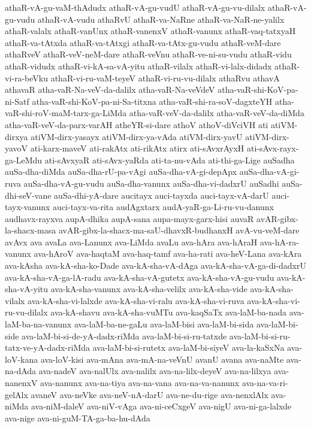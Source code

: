 {athaR-vA-gu-vaM-thAdudx
athaR-vA-gu-vudU
athaR-vA-gu-vu-dilalx
athaR-vA-gu-vudu
athaR-vA-vudu
athaRvU
athaR-va-NaRne
athaR-va-NaR-ne-yalilx
athaR-valalx
athaR-vanUnx
athaR-vanenxV
athaR-vanunx
athaR-vaq-tatxyaH
athaR-va-tAtxda
athaR-va-tAtxgi
athaR-va-tAtx-gu-vudu
athaR-veM-dare
athaRveV
athaR-veV-neM-dare
athaR-veVnu
athaR-ve-ni-su-vudu
athaR-vidu
athaR-vidudx
athaR-vi-kA-sa-vA-yitu
athaR-vilalx
athaR-vi-lalx-didadx
athaR-vi-ra-beVku
athaR-vi-ru-vaM-teyeV
athaR-vi-ru-vu-dilalx
athaRvu
athavA
athavaR
atha-vaR-Na-veV-da-dalilx
atha-vaR-Na-veVdeV
atha-vaR-shi-KoV-pa-ni-Satf
atha-vaR-shi-KoV-pa-ni-Sa-titxna
atha-vaR-shi-ra-soV-dagxteYH
atha-vaR-shi-roV-maM-tarx-ga-LiMda
atha-vaR-veV-da-dalilx
atha-vaR-veV-da-diMda
atha-vaR-veV-da-parx-varAH
atheYR-si-dare
athoV
athoV-diVciVH
ati
atiVM-dirxya
atiVM-dirx-yasayx
atiVM-dirx-ya-vAda
atiVM-dirx-yavU
atiVM-dirx-yavoV
ati-karx-maveV
ati-rakAtx
ati-rikAtx
atirx
ati-sAvxrAyxH
ati-sAvx-rayx-ga-LeMdu
ati-sAvxyaR
ati-sAvx-yaRda
ati-ta-nu-vAda
ati-thi-ga-Lige
auSadha
auSa-dha-diMda
auSa-dha-rU-pa-vAgi
auSa-dha-vA-gi-depApx
auSa-dha-vA-gi-ruva
auSa-dha-vA-gu-vudu
auSa-dha-vanunx
auSa-dha-vi-dadxrU
auSadhi
auSa-dhi-seV-vane
auSa-dhi-yA-dare
aucitayx
auci-tayxda
auci-tayx-vA-darU
auci-tayx-vanunx
auci-tayx-va-rita
audAgxtarx
audA-yaR-ga-Li-ru-vu-danunx
audhavx-rayxva
aupA-dhika
aupA-sana
aupa-mayx-garx-hisi
auvaR
avAR-gibx-la-shacx-masa
avAR-gibx-la-shacx-ma-saU-dhavxR-budhanxH
avA-vu-veM-dare
avAvx
ava
avaLa
ava-Lanunx
ava-LiMda
avaLu
ava-hAra
ava-hAraH
ava-hA-ra-vanunx
ava-hAroV
ava-haqtaM
ava-haq-tamf
ava-ha-rati
ava-heV-Lana
ava-kAra
ava-kAsha
ava-kA-sha-ko-Dade
ava-kA-sha-vA-dAga
ava-kA-sha-vA-ga-di-dadxrU
ava-kA-sha-vA-ga-lA-radu
ava-kA-sha-vA-gutetx
ava-kA-sha-vA-gu-vudu
ava-kA-sha-vA-yitu
ava-kA-sha-vanunx
ava-kA-sha-velilx
ava-kA-sha-vide
ava-kA-sha-vilalx
ava-kA-sha-vi-lalxde
ava-kA-sha-vi-ralu
ava-kA-sha-vi-ruva
ava-kA-sha-vi-ru-vu-dilalx
ava-kA-shavu
ava-kA-sha-vuMTu
ava-kaqSaTx
ava-laM-ba-nada
ava-laM-ba-na-vanunx
ava-laM-ba-ne-gaLu
ava-laM-bisi
ava-laM-bi-sida
ava-laM-bi-side
ava-laM-bi-si-de-yA-dadx-riMda
ava-laM-bi-si-ru-tatxde
ava-laM-bi-si-ru-tatx-ve-yA-dadx-riMda
ava-laM-bi-si-rutetx
ava-laM-bi-siyeV
ava-la-kaSxNa
ava-loV-kana
ava-loV-kisi
ava-mAna
ava-mA-na-veVnU
avanU
avana
ava-naMte
ava-na-dAda
ava-nadeV
ava-nalUlx
ava-nalilx
ava-na-lilx-deyeV
ava-na-lilxya
ava-nanenxV
ava-nanunx
ava-na-tiya
ava-na-vana
ava-na-va-nanunx
ava-na-va-ri-gelAlx
avaneV
ava-neVke
ava-neV-nA-darU
ava-ne-du-rige
ava-nenxlAlx
ava-niMda
ava-niM-daleV
ava-niV-vAga
ava-ni-ceCxgeV
ava-nigU
ava-ni-ga-lalxde
ava-nige
ava-ni-guM-TA-ga-ba-hu-dAda
}
